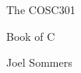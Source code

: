 \pagestyle{empty}

\vspace*{0.5\fill}
\begin{center}
\HUGE\textsf{The COSC301}\par
\end{center}
\begin{center}
\HUGE\textsf{Book of C}\par
\end{center}

\vspace{2\onelineskip}
\begin{center}
\LARGE\textsf{Joel Sommers}\par
\end{center}
\vspace*{\fill}
